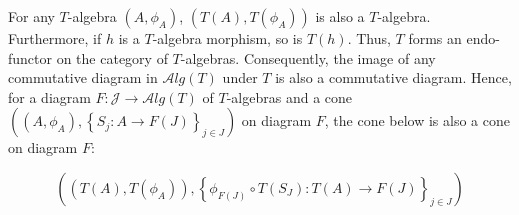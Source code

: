 \documentclass[10pt,a4paper]{article}
\begin{document}
 
For any $T$-algebra $(A,\phi_{A})$, $(T(A),T(\phi_{A}))$ is also a $T$-algebra. Furthermore, if $h$ is a $T$-algebra morphism, so is $T(h)$. Thus, $T$ forms an endo-functor on the category of $T$-algebras. Consequently, the image of any commutative diagram in $\mathcal{A}lg(T)$ under $T$ is also a commutative diagram. Hence, for a diagram $F:\mathcal{J}\to\mathcal{A}lg(T)$ of $T$-algebras and a cone $\left((A,\phi_{A}),\left\{S_{j}:A\to F(J)\right\}_{j\in J}\right)$ on diagram $F$, the cone below is also a cone on diagram $F$:\par
    \[\left((T(A),T(\phi_{A})),\left\{\phi_{F(J)}\circ T(S_{J}):T(A)\to F(J)\right\}_{j\in J}\right)\]    
 
 
 
\par
 
 
 
 
\end{document}
